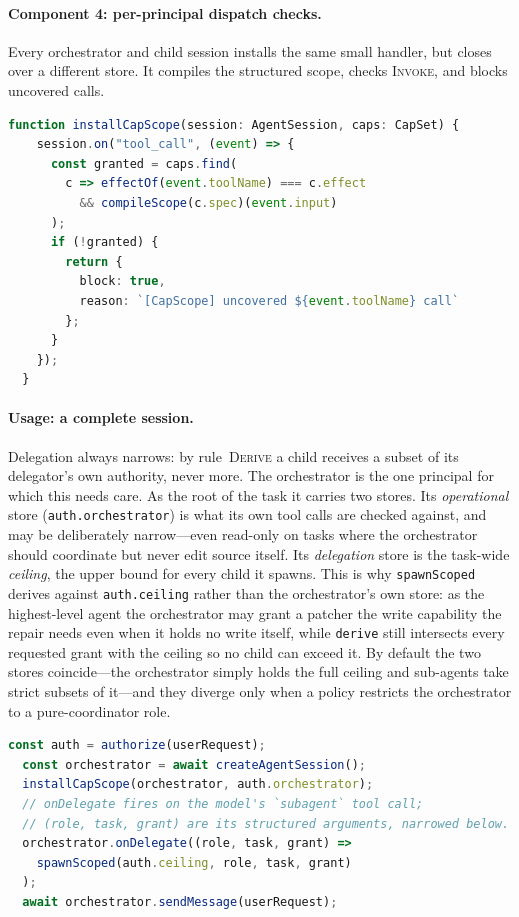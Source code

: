 \documentclass[sigplan,review,anonymous]{acmart}
\newcommand{\tool}{CapScope\xspace}
\newcommand{\rulename}[1]{\textsc{#1}}
\begin{document}
  \paragraph{Component 4: per-principal dispatch checks.}
  Every orchestrator and child session installs the same small handler, but
  closes over a different store. It compiles the structured scope, checks
  \rulename{Invoke}, and blocks uncovered calls.
  
  \begin{lstlisting}[language=TypeScript,style=tsstyle,caption={The
    per-principal \tool\ hook.}]
  function installCapScope(session: AgentSession, caps: CapSet) {
    session.on("tool_call", (event) => {
      const granted = caps.find(
        c => effectOf(event.toolName) === c.effect
          && compileScope(c.spec)(event.input)
      );
      if (!granted) {
        return {
          block: true,
          reason: `[CapScope] uncovered ${event.toolName} call`
        };
      }
    });
  }
  \end{lstlisting}
  
  \paragraph{Usage: a complete session.}
  Delegation always narrows: by rule~\rulename{Derive} a child receives a
  subset of its delegator's own authority, never more. The orchestrator is the
  one principal for which this needs care. As the root of the task it carries
  two stores. Its \emph{operational} store (\texttt{auth.orchestrator}) is what
  its own tool calls are checked against, and may be deliberately narrow---even
  read-only on tasks where the orchestrator should coordinate but never edit
  source itself. Its \emph{delegation} store is the task-wide
  \emph{ceiling}, the upper bound for every child it spawns. This is why
  \texttt{spawnScoped} derives against \texttt{auth.ceiling} rather than the
  orchestrator's own store: as the highest-level agent the orchestrator may
  grant a patcher the write capability the repair needs even when it holds no
  write itself, while \texttt{derive} still intersects every requested grant
  with the ceiling so no child can exceed it. By default the two stores
  coincide---the orchestrator simply holds the full ceiling and sub-agents take
  strict subsets of it---and they diverge only when a policy restricts the
  orchestrator to a pure-coordinator role.
  
  \begin{lstlisting}[language=TypeScript,style=tsstyle,caption={Complete
    orchestrator setup.}]
  const auth = authorize(userRequest);
  const orchestrator = await createAgentSession();
  installCapScope(orchestrator, auth.orchestrator);
  // onDelegate fires on the model's `subagent` tool call;
  // (role, task, grant) are its structured arguments, narrowed below.
  orchestrator.onDelegate((role, task, grant) =>
    spawnScoped(auth.ceiling, role, task, grant)
  );
  await orchestrator.sendMessage(userRequest);
  \end{lstlisting}
  
\end{document}
